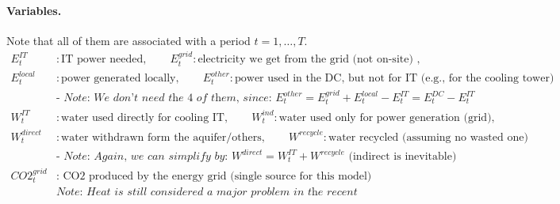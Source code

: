 \documentclass{article}
\begin{document}
\paragraph{Variables.} Note that all of them are associated with a period $t = 1,\ldots,T$.
\begin{align*}
        E^{IT}_t&: \text{IT power needed}, \qquad E^{grid}_t: \text{electricity we get from the grid (not on-site) },\\
    E^{local}_t&: \text{power generated locally}, \qquad E^{other}_t: \text{power used in the DC, but not for IT (e.g., for the cooling tower)}\\
    &\textit{- Note: We don't need the  4 of them, since: } E^{other}_t= E^{grid}_t + E^{local}_t -  E^{IT}_t = E_t^{DC} -  E^{IT}_t \\
    W^{IT}_t&: \text{water used directly for cooling IT}, \qquad W^{ind}_t: \text{water used only for power generation (grid)},\\
    W^{direct}_t&: \text{water withdrawn form the aquifer/others}, \qquad W^{recycle}:\text{water recycled (assuming no wasted one)}  \\
        &\textit{- Note: Again, we can simplify by: } W^{direct}=  W^{IT}_t + W^{recycle} \text{ (indirect is inevitable)} \\
    CO2_t^{grid}&: \text{ CO2 produced by the energy grid (single source for this model)}\\
    &\textit{Note: Heat is still considered a major problem in the recent literature, for the surrounding environment.}
\end{align*}
\end{document}
